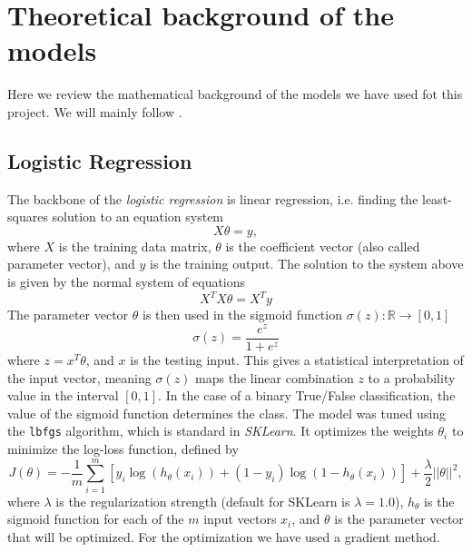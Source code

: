 
\section{Theoretical background of the models}

Here we review the mathematical background of the models we have used fot this project. We will mainly follow  \cite{lindholm2022machine}.

    \subsection{Logistic Regression}
    The backbone of the \emph{logistic regression} is linear regression, i.e. finding the least-squares solution to an equation system 
        \begin{equation*}
            X\theta = y,
        \end{equation*}
     where $X$ is the training data matrix, $\theta$ is the coefficient vector (also called parameter vector), and $y$ is the training output. The solution to the system above is given by the normal system of equations 
        \begin{equation*}
            X^TX \theta = X^Ty
        \end{equation*}
    The parameter vector $\theta$ is then used in the sigmoid function $\sigma(z): \mathbb{R}\to [0,1]$
    \begin{equation*}
        \sigma(z) = \frac{e^{z}}{1+e^{z}}
    \end{equation*}
    where $  z = x^T \theta$, and $x$ is the testing input. This gives a statistical interpretation of the input vector, meaning $\sigma(z)$ maps the linear combination $z$ to a probability value in the interval $[0,1]$. In the case of a binary True/False classification, the value of the sigmoid function  determines the class. The model was tuned using the \texttt{lbfgs} algorithm, which is standard in \emph{SKLearn}. It optimizes the weights  $\theta_i$ to minimize the log-loss function, defined by 
    \begin{equation}
        J(\theta) = - \frac{1}{m} \sum_{i=1}^{m} \left[ y_i \log(h_\theta(x_i)) + (1 - y_i) \log(1 - h_\theta(x_i)) \right] + \frac{\lambda}{2} ||\theta||^2,
    \end{equation}
    where $\lambda$ is the regularization strength (default for SKLearn is $\lambda = 1.0$), $h_\theta$ is the sigmoid function for each of the $m$ input vectors $x_i$, and $\theta$ is the parameter vector that will be optimized. For the optimization we have used a gradient method.

